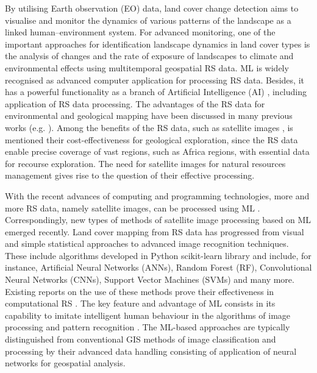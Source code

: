 \documentclass[12pt,a4paper,oneside]{article}
\def \newpar{\vspace{6pt}}
\begin{document}
\newpar By utilising Earth observation (EO) data, land cover change detection aims to visualise and monitor the dynamics of various patterns of the landscape as a linked human–environment system. For advanced monitoring, one of the important approaches for identification landscape dynamics in land cover types is the analysis of changes and the rate of exposure of landscapes to climate and environmental effects using multitemporal geospatial RS data. ML is widely recognised as advanced computer application for processing RS data. Besides, it has a powerful functionality as a branch of Artificial Intelligence (AI) \citep{YANG2024102087,RATHORE2016122,LEMENKOVA2025100180,CEDRIC2022100049}, including application of RS data processing. The advantages of the RS data for environmental and geological mapping have been discussed in many previous works (e.g. \citep{Parajuli,Niang2022,Ashpole}). Among the benefits of the RS data, such as satellite images \citep{GRANDJEAN2006220} , is mentioned their cost-effectiveness for geological exploration, since the RS data enable precise coverage of vast regions, such as Africa regions, with essential data for recourse exploration. The need for satellite images for natural resources management gives rise to the question of their effective processing.

\newpar With the recent advances of computing and programming technologies, more and more RS data, namely satellite images, can be processed using ML \citep{BELMAHDI2023100906,Lemenkova202021,GOMEZ201929}. Correspondingly, new types of methods of satellite image processing based on ML emerged recently. Land cover mapping from RS data has progressed from visual and simple statistical approaches to advanced image recognition techniques. These include algorithms developed in Python scikit-learn library and include, for instance, Artificial Neural Networks (ANNs), Random Forest (RF), Convolutional Neural Networks (CNNs), Support Vector Machines (SVMs) and many more. Existing reports on the use of these methods prove their effectiveness in computational RS \citep{Lemenkova202411,GAWUSU2024100065,Lemenkova202410,NENKAM2024117007}. The key feature and advantage of ML consists in its capability to imitate intelligent human behaviour in the algorithms of image processing and pattern recognition \citep{EBRAHIMY2023103390,PANDE2024141035,Lemenkova202217}. The ML-based approaches are typically distinguished from conventional GIS methods of image classification and processing by their advanced data handling consisting of application of neural networks for geospatial analysis. 
\end{document}
